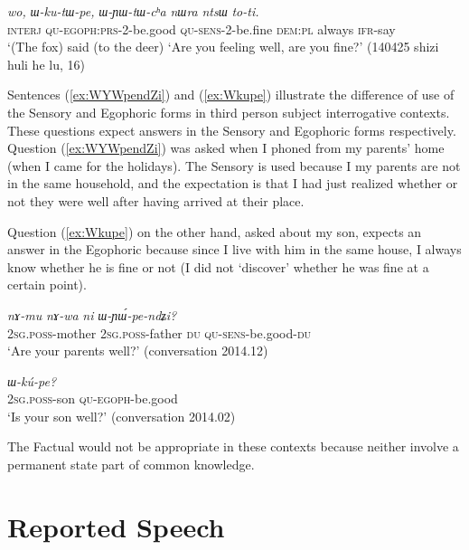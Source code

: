 \documentclass[oldfontcommands,oneside,a4paper,11pt]{article}
\newcommand{\ipa}[1]{{\phon\textit{#1}}} %
\newcommand{\refb}[1]{(\ref{#1})}
\begin{document}
\begin{exe}
\ex \label{ex:WkutWpe}
\gll 
\ipa{wo,} 	\ipa{ɯ-ku-tɯ-pe,} 	\ipa{ɯ-ɲɯ-tɯ-cʰa} 	\ipa{nɯra} 	\ipa{ntsɯ} 	\ipa{to-ti.} \\
\textsc{interj} \textsc{qu-egoph:prs}-2-be.good \textsc{qu-sens}-2-be.fine \textsc{dem:pl} always \textsc{ifr}-say  \\
\glt `(The fox) said (to the deer) `Are you feeling well, are you fine?' (140425 shizi huli he lu, 16)
\end{exe}

Sentences \refb{ex:WYWpendZi} and \refb{ex:Wkupe} illustrate the difference of use of the Sensory and Egophoric forms in third person subject interrogative contexts. These questions expect answers in the Sensory and Egophoric forms respectively. Question \refb{ex:WYWpendZi} was asked when I phoned from my parents' home (when I came for the holidays). The Sensory is used because I my parents are not in the same household, and the expectation is that I had just realized whether or not they were well after having arrived at their place. 

Question \refb{ex:Wkupe} on the other hand, asked about my son, expects an answer in the Egophoric because since I live with him in the same house, I always know whether he is fine or not (I did not `discover' whether he was fine at a certain point).

\begin{exe}
\ex \label{ex:WYWpendZi}
\gll 
\ipa{nɤ-mu}  	\ipa{nɤ-wa}  	\ipa{ni}  	\ipa{ɯ-ɲɯ́-pe-ndʑi?}  \\
\textsc{2sg.poss}-mother \textsc{2sg.poss}-father \textsc{du} \textsc{qu-sens}-be.good-\textsc{du} \\
\glt `Are your parents well?' (conversation 2014.12)
\end{exe}


\begin{exe}
\ex \label{ex:Wkupe}
\gll \ipa{nɤ-tɕɯ} \ipa{ɯ-kú-pe?}\\
\textsc{2sg.poss}-son \textsc{qu-egoph}-be.good\\
\glt `Is your son well?' (conversation 2014.02)
\end{exe}

The Factual would not be appropriate in these contexts because neither involve a permanent state part of common knowledge.


\section{Reported Speech} \label{sec:hybrid}
\end{document}
